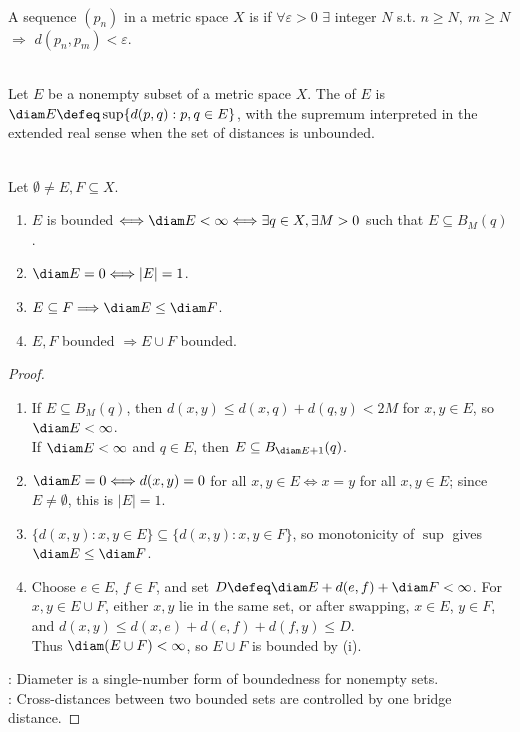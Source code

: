 \begin{definition} \label{def:cauchy-sequence} \\
A sequence $(p_n)$ in a metric space $X$ is  if $\forall \varepsilon>0$  $\exists$ integer $N$ s.t. $n\geq N,\ m\geq N$ $\Longrightarrow$ $d(p_n,p_m)<\varepsilon$.
\end{definition}

\begin{definition} \label{def:diameter-of-metric-set} \\
Let $E$ be a nonempty subset of a metric space $X$. The  of $E$ is $\diam E\defeq\sup\{d(p,q):p,q\in E\}$, with the supremum interpreted in the extended real sense when the set of distances is unbounded.
\end{definition}

\begin{proposition} \label{prop:diameter-basic-properties} \\
Let $\emptyset\ne E,F\subseteq X$.
\begin{enumerate}[label=(\roman*)]
\setlength{\itemsep}{0pt}
\item $E$ is bounded $\Longleftrightarrow\diam E<\infty\Longleftrightarrow\exists q\in X,\exists M>0$ such that $E\subseteq B_M(q)$.
\item $\diam E=0\Longleftrightarrow |E|=1$.
\item $E\subseteq F\Longrightarrow\diam E\leq\diam F$.
\item $E,F$ bounded $\Longrightarrow E\cup F$ bounded.
\end{enumerate}
\begin{proof}
\begin{enumerate}[label=(\roman*)]
\setlength{\itemsep}{0pt}
\item If $E\subseteq B_M(q)$, then $d(x,y)\leq d(x,q)+d(q,y)<2M$ for $x,y\in E$, so $\diam E<\infty$.\\
If $\diam E<\infty$ and $q\in E$, then $E\subseteq B_{\diam E+1}(q)$.
\item $\diam E=0\Longleftrightarrow d(x,y)=0$ for all $x,y\in E\Longleftrightarrow x=y$ for all $x,y\in E$; since $E\ne\emptyset$, this is $|E|=1$.
\item $\{d(x,y):x,y\in E\}\subseteq\{d(x,y):x,y\in F\}$, so monotonicity of $\sup$ gives $\diam E\leq\diam F$.
\item Choose $e\in E$, $f\in F$, and set $D\defeq\diam E+d(e,f)+\diam F<\infty$. For $x,y\in E\cup F$, either $x,y$ lie in the same set, or after swapping, $x\in E$, $y\in F$, and $d(x,y)\leq d(x,e)+d(e,f)+d(f,y)\leq D$.\\
Thus $\diam(E\cup F)<\infty$, so $E\cup F$ is bounded by (i).
\end{enumerate}
: Diameter is a single-number form of boundedness for nonempty sets.\\
: Cross-distances between two bounded sets are controlled by one bridge distance.
\end{proof}
\end{proposition}

